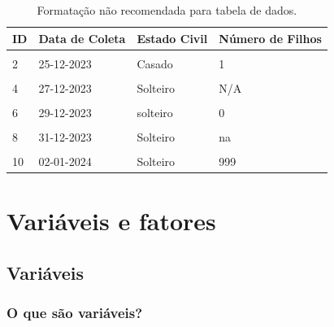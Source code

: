 \documentclass[
  a4paper,
]{book}
\begin{document}
\begin{table}

\caption{\label{tab:tabela-evite}Formatação não recomendada para tabela de dados.}
\centering
\begin{tabu} to 
\toprule
\textbf{ID} & \textbf{Data de Coleta} & \textbf{Estado Civil} & \textbf{Número de Filhos}\\
\midrule
{} &  &  & \\
2 & 25-12-2023 & Casado & 1\\
 &  &  & \\
4 & 27-12-2023 & Solteiro & N/A\\
 &  &  & \\
6 & 29-12-2023 & solteiro & 0\\
 &  &  & \\
8 & 31-12-2023 & Solteiro & na\\
 &  &  & \\
10 & 02-01-2024 & Solteiro & 999\\
\bottomrule
\end{tabu}
\end{table}

\hypertarget{variaveis-fatores}{%
\chapter{\texorpdfstring{\textbf{Variáveis e fatores}}{Variáveis e fatores}}\label{variaveis-fatores}}

\hypertarget{variaveis}{%
\section{Variáveis}\label{variaveis}}

\hypertarget{o-que-suxe3o-variuxe1veis}{%
\subsection{O que são variáveis?}\label{o-que-suxe3o-variuxe1veis}}
\end{document}
